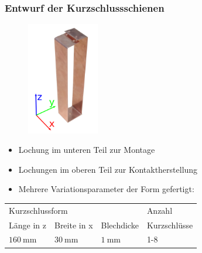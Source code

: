 \documentclass[accentcolor=tud9b, colorbacktitle, inverttitle]{tudbeamer}
\begin{document}
\begin{frame}\frametitle{Entwurf der Kurzschlussschienen}
\vspace{-2em}
	\begin{figure}[h]
		\flushleft
		\includegraphics[width=0.28\textwidth]{KS}
	\end{figure}
\vspace{-0.45\textwidth}
\hspace{0.3\textwidth}
\begin{minipage}[t]{0.6\textwidth}
	\begin{itemize}
		\item Lochung im unteren Teil zur Montage
		\item Lochungen im oberen Teil zur Kontaktherstellung
		\item Mehrere Variationsparameter der Form gefertigt:
	\end{itemize}
\end{minipage}	
	\begin{minipage}[t]{0.6\textwidth}
\vspace{1em}
\hspace{0.55\textwidth}
{\small
	\begin{tabular}{ | l | l |  l | l | }
		\hline
		\multicolumn{3}{|l|}{Kurzschlussform} & Anzahl \\ \cline{0-2}
		L\"ange in z & Breite in x & Blechdicke & Kurzschl\"usse \\\hline
		$\SI{160}{\milli\meter}$ & $\SI{30}{\milli\meter}$ & $\SI{1}{\milli\meter}$ & 1-8 \\

\end{tabular}}
\end{minipage}
\end{frame}
\end{document}
